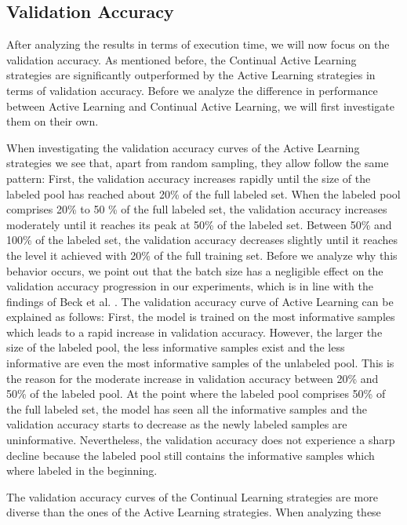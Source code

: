 \subsection{Validation Accuracy}
\label{sec:Discussion:ValidationAccuracy}
After analyzing the results in terms of execution time, we will now focus on the validation accuracy. As mentioned before, the Continual Active Learning
strategies are significantly outperformed by the Active Learning strategies in terms of validation accuracy. Before we analyze the difference in performance
between Active Learning and Continual Active Learning, we will first investigate them on their own. \par
When investigating the validation accuracy curves of the Active Learning strategies we see that, apart from random sampling, they allow follow the same
pattern: First, the validation accuracy increases rapidly until the size of the labeled pool has reached about 20\% of the full labeled set. When the labeled
pool comprises 20\% to 50 \% of the full labeled set, the validation accuracy increases moderately until it reaches its peak at 50\% of the labeled set. Between
50\% and 100\% of the labeled set, the validation accuracy decreases slightly until it reaches the level it achieved with 20\% of the full training set. Before
we analyze why this behavior occurs, we point out that the batch size has a negligible effect on the validation accuracy progression in our experiments, which
is in line with the findings of Beck et al. \cite{beck2021effective}. The validation accuracy curve of Active Learning can be explained as follows: First, the
model is trained on the most informative samples which leads to a rapid increase in validation accuracy. However, the larger the size of the labeled pool, the
less informative samples exist and the less informative are even the most informative samples of the unlabeled pool. This is the reason for the moderate increase
in validation accuracy between 20\% and 50\% of the labeled pool. At the point where the labeled pool comprises 50\% of the full labeled set, the model has seen
all the informative samples and the validation accuracy starts to decrease as the newly labeled samples are uninformative. Nevertheless, the validation accuracy
does not experience a sharp decline because the labeled pool still contains the informative samples which where labeled in the beginning. \par
The validation accuracy curves of the Continual Learning strategies are more diverse than the ones of the Active Learning strategies. When analyzing these
